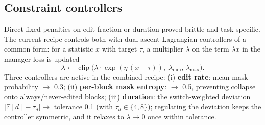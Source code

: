 \documentclass[10pt]{article}
\begin{document}
\subsection{Constraint controllers}
Direct fixed penalties on edit fraction or duration proved brittle and
task-specific. The current recipe controls both with dual-ascent Lagrangian
controllers of a common form: for a statistic $x$ with target $\tau$, a
multiplier $\lambda$ on the term $\lambda x$ in the manager loss is updated
\begin{equation}
\lambda \leftarrow \operatorname{clip}\!\big(\lambda \cdot \exp(\eta\,(x - \tau)),\;
\lambda_{\min},\, \lambda_{\max}\big).
\label{eq:dual}
\end{equation}
Three controllers are active in the combined recipe:
(i) \textbf{edit rate}: mean mask probability $\to$ 0.3;
(ii) \textbf{per-block mask entropy}: $\to$ 0.5, preventing collapse onto
always/never-edited blocks;
(iii) \textbf{duration}: the switch-weighted deviation
$|\mathbb{E}[d] - \tau_d| \to$ tolerance 0.1 (with $\tau_d \in \{4, 8\}$);
regulating the deviation keeps the controller symmetric, and it relaxes to
$\lambda \to 0$ once within tolerance.
\end{document}

